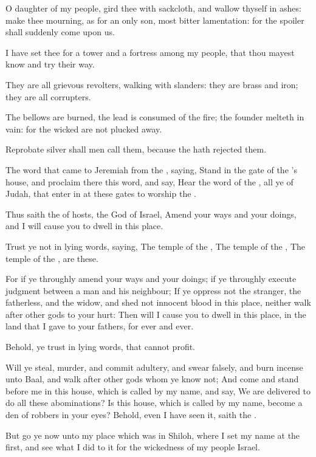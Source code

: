 \Verse O daughter of my people, gird thee with sackcloth, and wallow thyself in ashes: make thee mourning, as for an only son, most bitter lamentation: for the spoiler shall suddenly come upon us.

\Verse I have set thee for a tower and a fortress among my people, that thou mayest know and try their way.

\Verse They are all grievous revolters, walking with slanders: they are brass and iron; they are all corrupters.

\Verse The bellows are burned, the lead is consumed of the fire; the founder melteth in vain: for the wicked are not plucked away.

\Verse Reprobate silver shall men call them, because the \LORD hath rejected them.


\Chapter
\Verse The word that came to Jeremiah from the \LORD, saying, \Verse Stand in the gate of the \LORD's house, and proclaim there this word, and say, Hear the word of the \LORD, all ye of Judah, that enter in at these gates to worship the \LORD.

\Verse Thus saith the \LORD of hosts, the God of Israel, Amend your ways and your doings, and I will cause you to dwell in this place.

\Verse Trust ye not in lying words, saying, The temple of the \LORD, The temple of the \LORD, The temple of the \LORD, are these.

\Verse For if ye throughly amend your ways and your doings; if ye throughly execute judgment between a man and his neighbour; \Verse If ye oppress not the stranger, the fatherless, and the widow, and shed not innocent blood in this place, neither walk after other gods to your hurt: \Verse Then will I cause you to dwell in this place, in the land that I gave to your fathers, for ever and ever.

\Verse Behold, ye trust in lying words, that cannot profit.

\Verse Will ye steal, murder, and commit adultery, and swear falsely, and burn incense unto Baal, and walk after other gods whom ye know not; \Verse And come and stand before me in this house, which is called by my name, and say, We are delivered to do all these abominations?  \Verse Is this house, which is called by my name, become a den of robbers in your eyes? Behold, even I have seen it, saith the \LORD.

\Verse But go ye now unto my place which was in Shiloh, where I set my name at the first, and see what I did to it for the wickedness of my people Israel.

